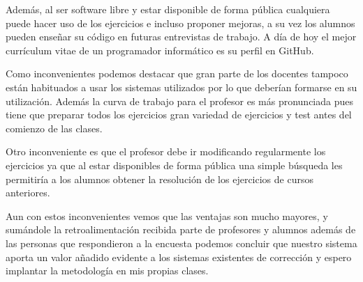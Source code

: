 Además, al ser software libre y estar disponible de forma pública cualquiera puede hacer uso de los ejercicios e incluso proponer mejoras, a su vez los alumnos pueden enseñar su código en futuras entrevistas de trabajo. A día de hoy el mejor currículum vitae de un programador informático es su perfil en GitHub.

Como inconvenientes podemos destacar que gran parte de los docentes tampoco están habituados a usar los sistemas utilizados por lo que deberían formarse en su utilización. Además la curva de trabajo para el profesor es más pronunciada pues tiene que preparar todos los ejercicios  gran variedad de ejercicios y test antes del comienzo de las clases.

Otro inconveniente es que el profesor debe ir modificando regularmente los ejercicios ya que al estar disponibles de forma pública una simple búsqueda les permitiría a los alumnos obtener la resolución de los ejercicios de cursos anteriores.

Aun con estos inconvenientes vemos que las ventajas son mucho mayores, y sumándole la retroalimentación recibida parte de profesores y alumnos además de las personas que respondieron a la encuesta podemos concluir que nuestro sistema aporta un valor añadido evidente a los sistemas existentes de corrección y espero implantar la metodología en mis propias clases.
